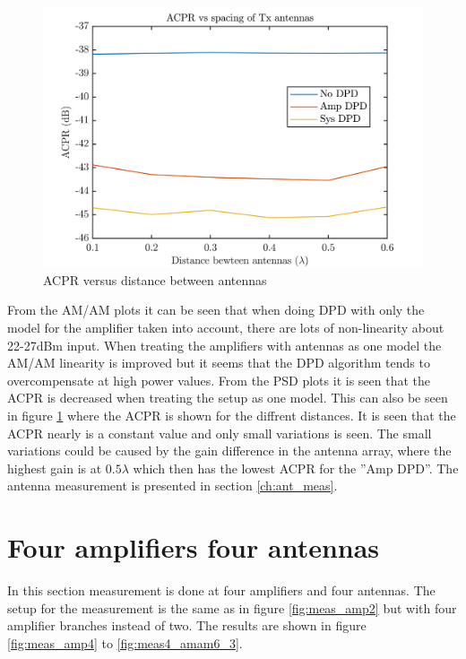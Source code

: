 \begin{figure}[H]
\centering 
\includegraphics[scale = 0.6]{figures/measurement/cree/meas3/acpr_two_ant.png}
\caption{ACPR versus distance between antennas}
\label{fig:meas2_dpd}
\end{figure}

From the AM/AM plots it can be seen that when doing DPD with only the model for the amplifier taken into account,  there are lots of non-linearity about 22-27dBm input. When treating the amplifiers with antennas as one model the AM/AM linearity is improved but it seems that the DPD algorithm tends to overcompensate at high power values. From the PSD plots it is seen that the ACPR is decreased when treating the setup as one model. This can also be seen in figure \ref{fig:meas2_dpd} where the ACPR is shown for the diffrent distances. It is seen that the ACPR nearly is a constant value and only small variations is seen. The small variations could be caused by the gain difference in the antenna array, where the highest gain is at $0.5\lambda$ which then has the lowest ACPR for the ''Amp DPD''. The antenna measurement is presented in section \ref{ch:ant_meas}.    





\section{Four amplifiers four antennas}

In this section measurement is done at four amplifiers and four antennas. The setup for the measurement is the same as in figure \ref{fig:meas_amp2} but with four amplifier branches instead of two. The results are shown in figure \ref{fig:meas_amp4} to \ref{fig:meas4_amam6_3}.

